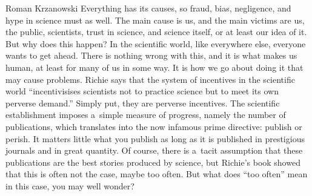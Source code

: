 \begin{newrevengenv}{Roman Krzanowski}
Everything has its causes, so fraud, bias, negligence, and hype in science must as well. The main cause is us, and the main victims are us, the public, scientists, trust in science, and science itself, or at least our idea of it. But why does this happen? In the scientific world, like everywhere else, everyone wants to get ahead. There is nothing wrong with this, and it is what makes us human, at least for many of us in some way. It is how we go about doing it that may cause problems. Richie says that the system of incentives in the scientific world ``incentivisises scientists not to practice science but to meet its own perverse demand.'' Simply put, they are perverse incentives. The scientific establishment imposes a~simple measure of progress, namely the number of publications, which translates into the now infamous prime directive: publish or perish. It matters little what you publish as long as it is published in prestigious journals and in great quantity. Of course, there is a~tacit assumption that these publications are the best stories produced by science, but Richie's book showed that this is often not the case, maybe too often. But what does ``too often'' mean in this case, you may well wonder?


\end{newrevengenv}
